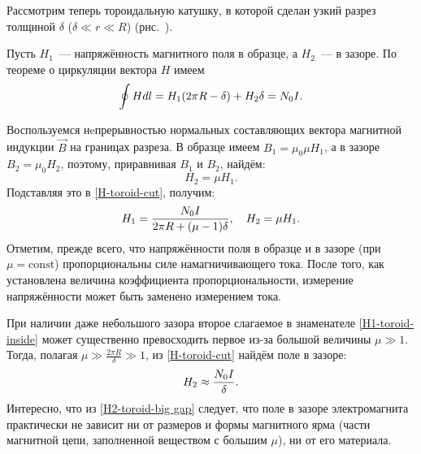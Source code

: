 Рассмотрим теперь тороидальную катушку, в которой сделан узкий разрез толщиной
$\delta$ ($\delta \ll r \ll R$) (рис.~).

Пусть $H_1$~--- напряжённость магнитного поля в
образце, а $H_2$~--- в зазоре. По теореме о циркуляции вектора $H$ имеем
\begin{equation}
	\eqmark{H-toroid-cut}
	\oint {Hdl} = H_1 (2\pi R - \delta) + H_2 \delta  = N_0 I.
\end{equation}

Воспользуемся нeпрерывностью нормальных составляющих вектора магнитной
индукции $\vec{B}$ на границах разреза. В образце имеем $B_1 = \mu_0 \mu H_1$,
а в зазоре $B_2 = \mu_0 H_2$, поэтому, приравнивая $B_1$ и $B_2$, найдём:
\begin{equation*}H_2 = \mu H_1.\end{equation*}
Подставляя это в \eqref{H-toroid-cut}, получим:
\begin{equation}
	\eqmark{H1-toroid-inside}
	H_1 = \frac{N_0 I}{2\pi R + (\mu - 1)\delta},\quad H_2 = \mu H_1.
\end{equation}
Отметим, прежде всего, что напряжённости поля в образце и в зазоре
(при $\mu = \mathrm{const}$) пропорциональны силе намагничивающего тока.
После того, как установлена величина коэффициента
пропорциональности, измерение напряжённости может быть заменено измерением тока.

При наличии даже небольшого зазора второе слагаемое в знаменателе
\eqref{H1-toroid-inside} может существенно превосходить первое из-за большой величины
$\mu\gg1$. Тогда, полагая $\mu\gg \frac{2\pi R}{\delta}\gg 1$, из
\eqref{H-toroid-cut} найдём поле в зазоре:
\begin{equation}
	\eqmark{H2-toroid-big gap}
	H_2 \approx \frac{N_0 I}{\delta}.
\end{equation}
Интересно, что из \eqref{H2-toroid-big gap} следует, что поле в зазоре
электромагнита практически не зависит ни от размеров и формы магнитного ярма (части
магнитной цепи, заполненной веществом с большим $\mu$), ни от его материала.




